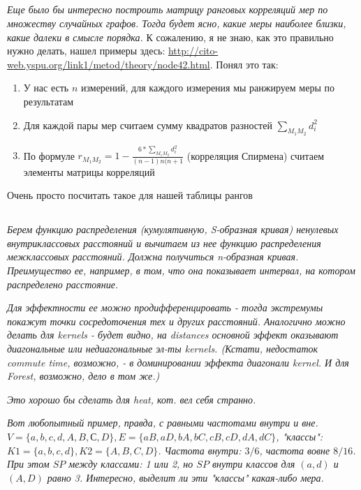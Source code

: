 \documentclass{article}
\begin{document}
\subsection{}
\textit{Еще было бы интересно построить матрицу ранговых корреляций мер по множеству случайных графов.
Тогда будет ясно, какие меры наиболее близки, какие далеки в смысле порядка.}
К сожалению, я не знаю, как это правильно нужно делать, нашел примеры здесь: \url{http://cito-web.yspu.org/link1/metod/theory/node42.html}. Понял это так:
\begin{enumerate}
\item У нас есть $n$ измерений, для каждого измерения мы ранжируем меры по результатам
\item Для каждой пары мер считаем сумму квадратов разностей $\sum_{M_1M_2} d_i^2$
\item По формуле $r_{M_1M_2} = 1 - \frac{6 * \sum_{M_1M_2} d_i^2}{(n-1)n(n+1}$ (корреляция Спирмена) считаем элементы матрицы корреляций
\end{enumerate}

Очень просто посчитать такое для нашей таблицы рангов 


\subsection{}
\textit{Берем функцию распределения (кумулятивную, S-образная кривая) ненулевых внутриклассовых расстояний и вычитаем из нее функцию распределения межклассовых расстояний. Должна получиться n-образная кривая. Преимущество ее, например, в том, что она показывает интервал, на котором распределено расстояние.}

\textit{Для эффектности ее можно продифференцировать - тогда экстремумы покажут точки сосредоточения тех и других расстояний. Аналогично можно делать для kernels - будет видно, на distances основной эффект оказывают диагональные или недиагональные эл-ты kernels. (Кстати, недостаток commute time, возможно, - в доминировании эффекта диагонали kernel. И для Forest, возможно, дело в том же.)}

\textit{Это хорошо бы сделать для heat, кот. вел себя странно.}



\textit{Вот любопытный пример, правда, с равными частотами внутри и вне.  $V = \{a, b, c, d, A, B, С, D\}, E = \{aB, aD, bA, bC, cB, cD, dA, dC\}$, "классы": $K1 = \{a, b, c, d\}, K2 = \{A, B, C, D\}$. Частота внутри: $3/6$, частота вовне $8/16$. При этом $SP$ между классами: 1 или 2, но $SP$ внутри классов для $(a, d)$ и $(A, D)$ равно 3. Интересно, выделит ли эти "классы" какая-либо мера.}
\end{document}

